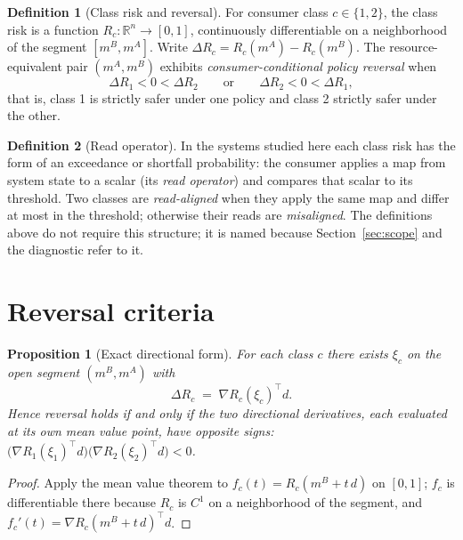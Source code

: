 \documentclass[11pt]{article}
\newtheorem{proposition}{Proposition}
\theoremstyle{definition}
\newtheorem{definition}{Definition}
\theoremstyle{remark}
\newcommand{\R}{\mathbb{R}}
\begin{document}
\begin{definition}[Class risk and reversal]\label{def:reversal}
For consumer class $c \in \{1,2\}$, the class risk is a function
$R_c:\R^n \to [0,1]$, continuously differentiable on a neighborhood of the
segment $[m^B, m^A]$. Write $\Delta R_c = R_c(m^A) - R_c(m^B)$.
The resource-equivalent pair $(m^A, m^B)$ exhibits
\emph{consumer-conditional policy reversal} when
\begin{equation}\label{eq:reversal}
\Delta R_1 < 0 < \Delta R_2
\qquad\text{or}\qquad
\Delta R_2 < 0 < \Delta R_1 ,
\end{equation}
that is, class 1 is strictly safer under one policy and class 2 strictly
safer under the other.
\end{definition}

\begin{definition}[Read operator]\label{def:read}
In the systems studied here each class risk has the form of an exceedance or
shortfall probability: the consumer applies a map from system state to a
scalar (its \emph{read operator}) and compares that scalar to its threshold.
Two classes are \emph{read-aligned} when they apply the same map and differ
at most in the threshold; otherwise their reads are \emph{misaligned}. The
definitions above do not require this structure; it is named because
Section~\ref{sec:scope} and the diagnostic refer to it.
\end{definition}

\section{Reversal criteria}\label{sec:criteria}

\begin{proposition}[Exact directional form]\label{prop:mvt}
For each class $c$ there exists $\xi_c$ on the open segment $(m^B, m^A)$ with
\begin{equation}\label{eq:mvt}
\Delta R_c \;=\; \nabla R_c(\xi_c)^{\top} d .
\end{equation}
Hence reversal holds if and only if the two directional derivatives, each
evaluated at its own mean value point, have opposite signs:
$\bigl(\nabla R_1(\xi_1)^{\top} d\bigr)\bigl(\nabla R_2(\xi_2)^{\top}
d\bigr) < 0$.
\end{proposition}

\begin{proof}
Apply the mean value theorem to $f_c(t) = R_c(m^B + t\,d)$ on $[0,1]$; $f_c$
is differentiable there because $R_c$ is $C^1$ on a neighborhood of the
segment, and $f_c'(t) = \nabla R_c(m^B + t\,d)^{\top} d$.
\end{proof}
\end{document}
